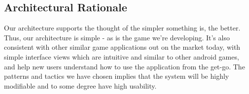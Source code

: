 \subsection{Architectural Rationale}

Our architecture supports the thought of the simpler something is, the better. Thus, our architecture is simple - as is the game we’re developing. It’s also consistent with other similar game applications out on the market today, with simple interface views which are intuitive and similar to other android games, and help new users understand how to use the application from the get-go. The patterns and tactics we have chosen implies that the system will be highly modifiable and to some degree have high usability.